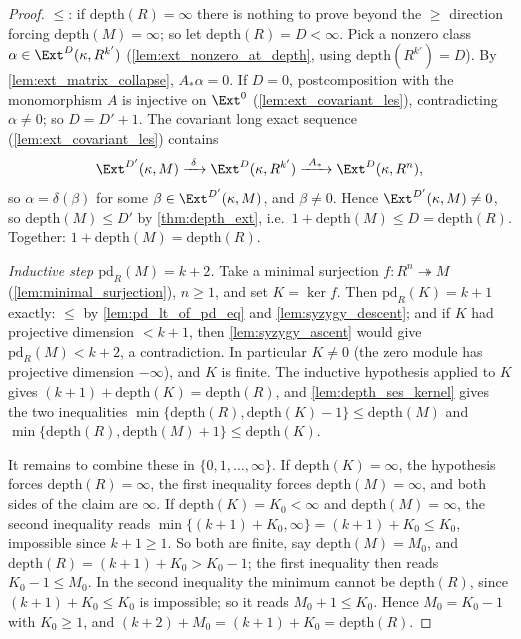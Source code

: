 \begin{proof}
  \(\leq\): if \(\mathrm{depth}(R) = \infty\) there is nothing to prove beyond the
  \(\geq\) direction forcing \(\mathrm{depth}(M) = \infty\); so let
  \(\mathrm{depth}(R) = D < \infty\). Pick a nonzero class
  \(\alpha \in \Ext^D(\kappa, R^{k'})\) (\ref{lem:ext_nonzero_at_depth}, using
  \(\mathrm{depth}(R^{k'}) = D\)). By \ref{lem:ext_matrix_collapse},
  \(A_*\alpha = 0\). If \(D = 0\), postcomposition with the monomorphism \(A\) is
  injective on \(\Ext^0\) (\ref{lem:ext_covariant_les}), contradicting
  \(\alpha \neq 0\); so \(D = D' + 1\). The covariant long exact sequence
  (\ref{lem:ext_covariant_les}) contains
  \[
    \Ext^{D'}(\kappa, M) \xrightarrow{\ \delta\ } \Ext^{D}(\kappa, R^{k'})
      \xrightarrow{\ A_*\ } \Ext^{D}(\kappa, R^n),
  \]
  so \(\alpha = \delta(\beta)\) for some \(\beta \in \Ext^{D'}(\kappa, M)\), and
  \(\beta \neq 0\). Hence \(\Ext^{D'}(\kappa, M) \neq 0\), so
  \(\mathrm{depth}(M) \leq D'\) by \ref{thm:depth_ext}, i.e.\
  \(1 + \mathrm{depth}(M) \leq D = \mathrm{depth}(R)\). Together:
  \(1 + \mathrm{depth}(M) = \mathrm{depth}(R)\).

  \emph{Inductive step \(\mathrm{pd}_R(M) = k + 2\).} Take a minimal surjection
  \(f : R^n \twoheadrightarrow M\) (\ref{lem:minimal_surjection}), \(n \geq 1\), and set
  \(K = \ker f\). Then \(\mathrm{pd}_R(K) = k + 1\) exactly: \(\leq\) by
  \ref{lem:pd_lt_of_pd_eq} and \ref{lem:syzygy_descent}; and if \(K\) had projective
  dimension \(< k + 1\), then \ref{lem:syzygy_ascent} would give
  \(\mathrm{pd}_R(M) < k + 2\), a contradiction. In particular \(K \neq 0\) (the zero
  module has projective dimension \(-\infty\)), and \(K\) is finite. The inductive
  hypothesis applied to \(K\) gives
  \((k + 1) + \mathrm{depth}(K) = \mathrm{depth}(R)\), and \ref{lem:depth_ses_kernel}
  gives the two inequalities
  \(\min\{\mathrm{depth}(R), \mathrm{depth}(K) - 1\} \leq \mathrm{depth}(M)\) and
  \(\min\{\mathrm{depth}(R), \mathrm{depth}(M) + 1\} \leq \mathrm{depth}(K)\).

  It remains to combine these in \(\{0, 1, \dots, \infty\}\). If
  \(\mathrm{depth}(K) = \infty\), the hypothesis forces
  \(\mathrm{depth}(R) = \infty\), the first inequality forces
  \(\mathrm{depth}(M) = \infty\), and both sides of the claim are \(\infty\). If
  \(\mathrm{depth}(K) = K_0 < \infty\) and \(\mathrm{depth}(M) = \infty\), the second
  inequality reads \(\min\{(k+1) + K_0, \infty\} = (k+1) + K_0 \leq K_0\), impossible
  since \(k + 1 \geq 1\). So both are finite, say \(\mathrm{depth}(M) = M_0\), and
  \(\mathrm{depth}(R) = (k+1) + K_0 > K_0 - 1\); the first inequality then reads
  \(K_0 - 1 \leq M_0\). In the second inequality the minimum cannot be
  \(\mathrm{depth}(R)\), since \((k+1) + K_0 \leq K_0\) is impossible; so it reads
  \(M_0 + 1 \leq K_0\). Hence \(M_0 = K_0 - 1\) with \(K_0 \geq 1\), and
  \((k + 2) + M_0 = (k + 1) + K_0 = \mathrm{depth}(R)\).
\end{proof}

